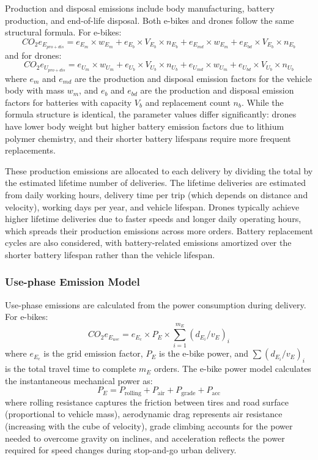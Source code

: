 \documentclass[11pt]{article}
\begin{document}
Production and disposal emissions include body manufacturing, battery production, and end-of-life disposal. Both e-bikes and drones follow the same structural formula. For e-bikes:
\begin{equation}
  CO_2e_{E_{pro+dis}} = e_{E_m} \times w_{E_m} + e_{E_b} \times V_{E_b} \times n_{E_b} + e_{E_{md}} \times w_{E_m} + e_{E_{bd}} \times V_{E_b} \times n_{E_b}
\end{equation}
and for drones:
\begin{equation}
  CO_2e_{U_{pro+dis}} = e_{U_m} \times w_{U_m} + e_{U_b} \times V_{U_b} \times n_{U_b} + e_{U_{md}} \times w_{U_m} + e_{U_{bd}} \times V_{U_b} \times n_{U_b}
\end{equation}
where $e_m$ and $e_{md}$ are the production and disposal emission factors for the vehicle body with mass $w_m$, and $e_b$ and $e_{bd}$ are the production and disposal emission factors for batteries with capacity $V_b$ and replacement count $n_b$. While the formula structure is identical, the parameter values differ significantly: drones have lower body weight but higher battery emission factors due to lithium polymer chemistry, and their shorter battery lifespans require more frequent replacements.

These production emissions are allocated to each delivery by dividing the total by the estimated lifetime number of deliveries. The lifetime deliveries are estimated from daily working hours, delivery time per trip (which depends on distance and velocity), working days per year, and vehicle lifespan. Drones typically achieve higher lifetime deliveries due to faster speeds and longer daily operating hours, which spreads their production emissions across more orders. Battery replacement cycles are also considered, with battery-related emissions amortized over the shorter battery lifespan rather than the vehicle lifespan.

\subsubsection{Use-phase Emission Model}

Use-phase emissions are calculated from the power consumption during delivery. For e-bikes:
\begin{equation}
  CO_2e_{E_{use}} = e_{E_c} \times P_{E} \times \sum_{i=1}^{m_E} (d_{E_i} / v_E)_i
\end{equation}
where $e_{E_c}$ is the grid emission factor, $P_E$ is the e-bike power, and $\sum (d_{E_i} / v_E)_i$ is the total travel time to complete $m_E$ orders. The e-bike power model calculates the instantaneous mechanical power as:
\begin{equation}
  P_{E} = P_{\text{rolling}} + P_{\text{air}} + P_{\text{grade}} + P_{\text{acc}}
\end{equation}
where rolling resistance captures the friction between tires and road surface (proportional to vehicle mass), aerodynamic drag represents air resistance (increasing with the cube of velocity), grade climbing accounts for the power needed to overcome gravity on inclines, and acceleration reflects the power required for speed changes during stop-and-go urban delivery.
\end{document}
